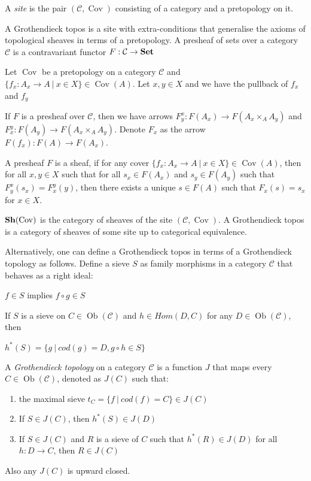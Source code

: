 \documentclass[a4paper]{article}
\theoremstyle{defin}
\theoremstyle{theorem}
\theoremstyle{claim}
\theoremstyle{prop}
\theoremstyle{lemma}
\theoremstyle{fact}
\theoremstyle{ex}
\theoremstyle{col}
\begin{document}
A \emph{site} is the pair $(\mathcal{C}, \operatorname{Cov})$ consisting of a category and a pretopology on it.

A Grothendieck topos is a site with extra-conditions that generalise the axioms of topological sheaves in terms of a pretopology. A presheaf of sets over a category $\mathcal{C}$ is a contravariant functor $F : \mathcal{C} \to {\bf Set}$

Let $\operatorname{Cov}$ be a pretopology on a category $\mathcal{C}$ and $\{ f_x : A_x \to A \: | \: x \in X \} \in \operatorname{Cov}(A)$. Let $x, y \in X$ and we have the pullback of $f_x$ and $f_y$


If $F$ is a presheaf over $\mathcal{C}$, then we have arrows $F^x_y : F(A_x) \to F(A_x \times_A A_y)$ and $F^y_x : F(A_y) \to F(A_x \times_A A_y)$. Denote $F_x$ as the arrow $F(f_x) : F(A) \to F(A_x)$.



A presheaf $F$ is a sheaf, if for any cover $\{ f_x : A_x \to A \: | \: x \in X \} \in \operatorname{Cov}(A)$, then for all $x, y \in X$ such that for all $s_x \in F(A_x)$ and $s_y \in F(A_y)$ such that $F^x_y(s_x) = F^y_x(y)$, then there exists a unique $s \in F(A)$ such that $F_x(s) = s_x$ for $x \in X$.

${\bf Sh}(\operatorname{Cov})$ is the category of sheaves of the site $(\mathcal{C}, \operatorname{Cov})$. A Grothendieck topos is a category of sheaves of some site up to categorical equivalence.

Alternatively, one can define a Grothendieck topos in terms of a Grothendieck topology as follows. Define a sieve $S$
as family morphisms in a category $\mathcal{C}$ that behaves as a right ideal:

\begin{center}
$f \in S$ implies $f \circ g \in S$
\end{center}

If $S$ is a sieve on $C \in \operatorname{Ob}(\mathcal{C})$ and $h \in Hom(D, C)$ for any $D \in \operatorname{Ob}(\mathcal{C})$, then
\begin{center}
$h^*(S) = \{ g \: | \: cod(g) = D, g \circ h \in S \}$
\end{center}

A \emph{Grothendieck topology} on a category $\mathcal{C}$ is a function $J$ that maps every $C \in \operatorname{Ob}(\mathcal{C})$, denoted as $J(C)$ such that:
\begin{enumerate}
\item the maximal sieve $t_C = \{ f \: | \: cod(f) = C\} \in J(C)$
\item If $S \in J(C)$, then $h^*(S) \in J(D)$
\item If $S \in J(C)$ and $R$ is a sieve of $C$ such that $h^*(R) \in J(D)$ for all $h : D \to C$, then $R \in J(C)$
\end{enumerate}
Also any $J(C)$ is upward closed.
\end{document}
